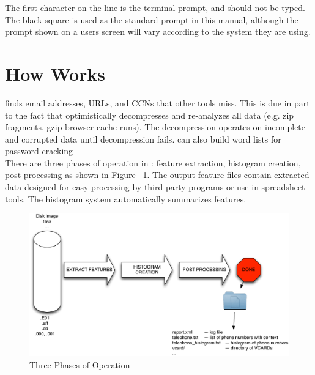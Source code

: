 \documentclass[11pt]{article} %
\begin{document}
The first character on the line is the terminal prompt, and should not be typed. The black square is used as the standard prompt in this manual, although the prompt shown on a users screen will vary according to the system they are using.\\


\section{How \bulk Works}
\bulk finds email addresses, URLs,  and CCNs that other tools miss. This is due in part to the fact that \bulk optimistically decompresses and re-analyzes all data (e.g. zip fragments, gzip browser cache runs). The decompression operates on incomplete and corrupted data until decompression fails. \bulk can also build word lists for password cracking\\

There are three phases of operation in \bulk:  feature extraction, histogram creation, post processing as shown in Figure ~\ref{fig:overviewPic}. The output feature files contain extracted data designed for easy processing by third party programs or use in spreadsheet tools. The \bulk histogram system automatically summarizes features.\\

\begin{figure}
	\center
	\includegraphics[scale=.60]{archPics/howitworks.pdf}
	\caption{Three Phases of \bulk Operation}
	\label{fig:overviewPic}
\end{figure}
\end{document}
